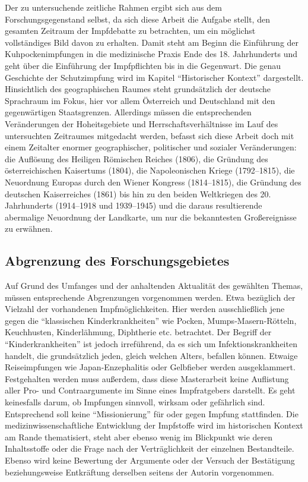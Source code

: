 \documentclass[
    a4paper,
    12pt,
    hyphens,
    chapterprefix=true,
    headheight=33pt,
    footheight=29pt,
    headings=optiontohead, %
]{scrartcl}
\begin{document}
Der zu untersuchende zeitliche Rahmen ergibt sich aus dem Forschungsgegenstand selbst, da sich diese Arbeit die Aufgabe stellt, den gesamten Zeitraum der Impfdebatte zu betrachten, um ein möglichst vollständiges Bild davon zu erhalten. Damit steht am Beginn die Einführung der Kuhpockenimpfungen in die medizinische Praxis Ende des 18. Jahrhunderts und geht über die Einführung der Impfpflichten bis in die Gegenwart. Die genau Geschichte der Schutzimpfung wird im Kapitel "`Historischer Kontext"' dargestellt.\\
Hinsichtlich des geographischen Raumes steht grundsätzlich der deutsche Sprachraum im Fokus, hier vor allem Österreich und Deutschland mit den gegenwärtigen Staatsgrenzen. Allerdings müssen die entsprechenden Veränderungen der Hoheitsgebiete und Herrschaftsverhältnisse im Lauf des untersuchten Zeitraumes mitgedacht werden, befasst sich diese Arbeit doch mit einem Zeitalter enormer geographischer, politischer und sozialer Veränderungen: die Auflösung des Heiligen Römischen Reiches (1806), die Gründung des österreichischen Kaisertums (1804), die Napoleonischen Kriege (1792--1815), die Neuordnung Europas durch den Wiener Kongress (1814--1815), die Gründung des deutschen Kaiserreiches (1861) bis hin zu den beiden Weltkriegen des 20. Jahrhunderts (1914--1918 und 1939--1945) und die daraus resultierende abermalige Neuordnung der Landkarte, um nur die bekanntesten Großereignisse zu erwähnen.

\subsection{Abgrenzung des Forschungsgebietes}
Auf Grund des Umfanges und der anhaltenden Aktualität des gewählten Themas, müssen entsprechende Abgrenzungen vorgenommen werden. Etwa bezüglich der Vielzahl der vorhandenen Impfmöglichkeiten. Hier  werden ausschließlich jene gegen die "`klassischen Kinderkrankheiten"' wie Pocken, Mumps-Masern-Rötteln, Keuchhusten, Kinderlähmung, Diphtherie etc. betrachtet. Der Begriff der "`Kinderkrankheiten"' ist jedoch irreführend, da es sich um Infektionskrankheiten handelt, die grundsätzlich jeden, gleich welchen Alters, befallen können. Etwaige Reiseimpfungen wie Japan-Enzephalitis oder Gelbfieber werden ausgeklammert.\\
Festgehalten werden muss außerdem, dass diese Masterarbeit keine Auflistung aller Pro- und Contraargumente im Sinne eines Impfratgebers darstellt. Es geht keinesfalls darum, ob Impfungen sinnvoll, wirksam oder gefährlich sind. Entsprechend soll keine "`Missionierung"' für oder gegen Impfung stattfinden. Die medizinwissenschaftliche Entwicklung der Impfstoffe wird im historischen Kontext am Rande thematisiert, steht aber ebenso wenig im Blickpunkt wie deren Inhaltsstoffe oder die Frage nach der Verträglichkeit der einzelnen Bestandteile. Ebenso wird keine Bewertung der Argumente oder der Versuch der Bestätigung beziehungsweise Entkräftung derselben seitens der Autorin vorgenommen.
\end{document}

